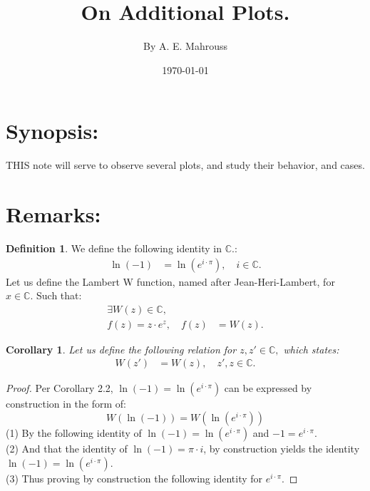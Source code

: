 \documentclass[10pt]{article}
\title{%
	\vspace{-1.5em}%
	\large\textbf{On Additional Plots.}%
}
\author{By A. E. Mahrouss}
\date{\today}
\theoremstyle{plain}
\newtheorem{corollary}[theorem]{Corollary}
\theoremstyle{definition}
\newtheorem{definition}[theorem]{Definition}
\theoremstyle{remark}
\begin{document}

\maketitle
\tableofcontents
\newpage

\section{Synopsis:}

\lettrine[lines=1, lhang=0.1, loversize=0.2]{T}HIS note will serve to observe several plots, and study their behavior, and cases.

\section{Remarks:}

\begin{definition}
	We define the following identity in $\mathbb{C}.$:
	\begin{align*}
		\ln(-1)&=\ln(e^{i \cdot \pi}), \quad i \in \mathbb{C}.
	\end{align*}
	Let us define the Lambert W function, named after Jean-Heri-Lambert, for $x \in \mathbb{C}.$ Such that:
	\begin{align*}
		\exists W(z) \in \mathbb{C},\\
		f(z) = z \cdot e^{z}, \quad f(z) &= W(z).
	\end{align*}
\end{definition}

\begin{corollary}
	Let us define the following relation for $z, z' \in \mathbb{C},$ which states:
	\begin{align*}
		W(z') &= W(z), \quad z', z \in \mathbb{C}.
	\end{align*}
\end{corollary}

\begin{proof}
	Per Corollary 2.2, $\ln(-1)=\ln(e^{i \cdot \pi})$ can be expressed by construction in the form of:
	\begin{equation}
		W(\ln(-1)) = W(\ln(e^{i \cdot \pi}))
	\end{equation}
	(1) By the following identity of $\ln(-1)=\ln(e^{i \cdot \pi})$ and $-1 = e^{i \cdot \pi}.$\\
	(2) And that the identity of $\ln(-1) = \pi \cdot i$, by construction yields the identity $\ln(-1) = \ln(e^{i \cdot \pi}).$\\
	(3) Thus proving by construction the following identity for $e^{i \cdot \pi}$.
\end{proof}

\nocite{*}




\end{document}
